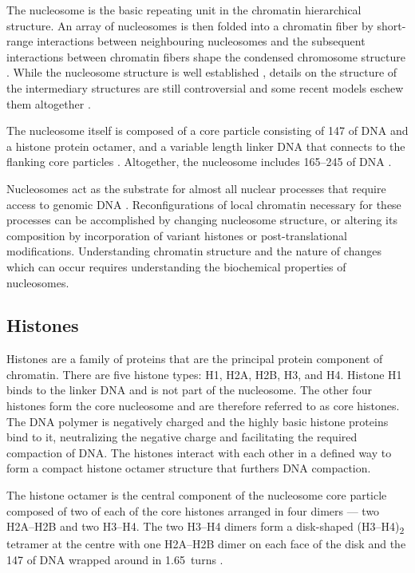   The nucleosome is the
  basic repeating unit in the chromatin hierarchical structure.
  An array of nucleosomes is then folded into a chromatin fiber by
  short-range interactions between neighbouring nucleosomes
  and the subsequent interactions between chromatin fibers shape the
  condensed chromosome structure .
  While the nucleosome
  structure is well established \citep{luger1997-28angstrom},
  details on the structure of the
  intermediary structures are still controversial and some recent models
  eschew them altogether
  \citep{fussner2011-no-30nm-fibre, luger2012-chromatin-review}.

  The nucleosome itself is composed of a core particle
  consisting of \SI{147}{\bp} of DNA and a histone protein octamer,
  and a variable length linker DNA that connects
  to the flanking core particles .
  Altogether, the nucleosome includes \SIrange{165}{245}{\bp} of DNA
  \citep{widom1992-linker-length}.

  Nucleosomes act as the substrate for almost all nuclear processes that
  require access to genomic DNA \citep{controlling-double-helix}.
  Reconfigurations of local chromatin necessary for these processes can
  be accomplished by changing nucleosome structure, or altering its
  composition by incorporation of variant histones or post-translational
  modifications.
  Understanding chromatin structure and the nature of changes which can
  occur requires understanding the biochemical properties of nucleosomes.

  \subsection{Histones}

    Histones are a family of proteins that are the principal protein component
    of chromatin.
    There are five histone types: H1, H2A, H2B, H3, and H4.
    Histone H1 binds to the linker DNA and is not part of the nucleosome.
    The other four histones form the core
    nucleosome and are therefore referred to as core histones.
    The DNA polymer is negatively charged and the highly
    basic histone proteins bind to it, neutralizing the negative charge
    and facilitating the required compaction of DNA.
    The histones interact with each other in a defined way to form
    a compact histone octamer structure that furthers
    DNA compaction.

    The histone octamer is the central component of the nucleosome core particle
    composed of two of each of the core histones arranged in four dimers
    --- two H2A--H2B and two H3--H4.
    The two H3--H4 dimers form a disk-shaped (H3--H4)\textsubscript{2}
    tetramer at the centre 
    with one H2A--H2B dimer on each face of the disk
    and the \SI{147}{\bp} of DNA wrapped around in 1.65~turns
    .

